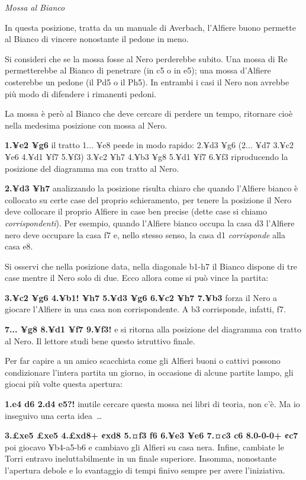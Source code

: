 
\emph{Mossa
al Bianco}

In questa posizione, tratta da un manuale di Averbach, l'Alfiere buono
permette al Bianco di vincere nonostante il pedone in meno.

Si consideri che se la mossa fosse al Nero perderebbe subito. Una mossa
di Re permetterebbe al Bianco di penetrare (in c5 o in e5); una mossa
d'Alfiere costerebbe un pedone (il Pd5 o il Ph5). In entrambi i casi il
Nero non avrebbe più modo di difendere i rimanenti pedoni.

La mossa è però al Bianco che deve cercare di perdere un tempo,
ritornare cioè nella medesima posizione con mossa al Nero.

\textbf{1.¥e2 ¥g6} il tratto 1... ¥e8 pe¢de in modo rapido: 2.¥d3 ¥g6
(2... ¥d7 3.¥c2 ¥e6 4.¥d1 ¥f7 5.¥f3) 3.¥c2 ¥h7 4.¥b3 ¥g8 5.¥d1 ¥f7 6.¥f3
riproducendo la posizione del diagramma ma con tratto al Nero.

\textbf{2.¥d3 ¥h7} analizzando la posizione risulta chiaro che quando
l'Alfiere bianco è collocato su certe case del proprio schieramento, per
tenere la posizione il Nero deve collocare il proprio Alfiere in case
ben precise (dette case si chiamo \emph{corrispondenti}). Per esempio,
quando l'Alfiere bianco occupa la casa d3 l'Alfiere nero deve occupare
la casa f7 e, nello stesso senso, la casa d1 \emph{corrisponde} alla
casa e8.

Si osservi che nella posizione data, nella diagonale b1-h7 il Bianco
dispone di tre case mentre il Nero solo di due. Ecco allora come si può
vince la partita:

\textbf{3.¥c2 ¥g6 4.¥b1! ¥h7 5.¥d3 ¥g6 6.¥c2 ¥h7 7.¥b3} forza il Nero a
giocare l'Alfiere in una casa non corrispondente. A b3 corrisponde,
infatti, f7.

\textbf{7... ¥g8 8.¥d1 ¥f7 9.¥f3!} e si ritorna alla posizione del
diagramma con tratto al Nero. Il lettore studi bene questo istruttivo
finale.

Per far capire a un amico scacchista come gli Alfieri buoni o cattivi
possono condizionare l'intera partita un giorno, in occasione di alcune
partite lampo, gli giocai più volte questa apertura:

\textbf{1.e4 d6 2.d4 e5?!} inutile cercare questa mossa nei libri di
teoria, non c'è. Ma io inseguivo una certa idea~\ldots{}

\textbf{3.£xe5 £xe5 4.£xd8+ ¢xd8 5.¤f3 f6 6.¥e3 ¥e6 7.¤c3 c6 8.0-0-0+
¢c7} poi giocavo ¥b4-a5-b6 e cambiavo gli Alfieri su casa nera. Infine,
cambiate le Torri entravo ineluttabilmente in un finale superiore.
Insomma, nonostante l'apertura debole e lo svantaggio di tempi finivo
sempre per avere l'iniziativa.

